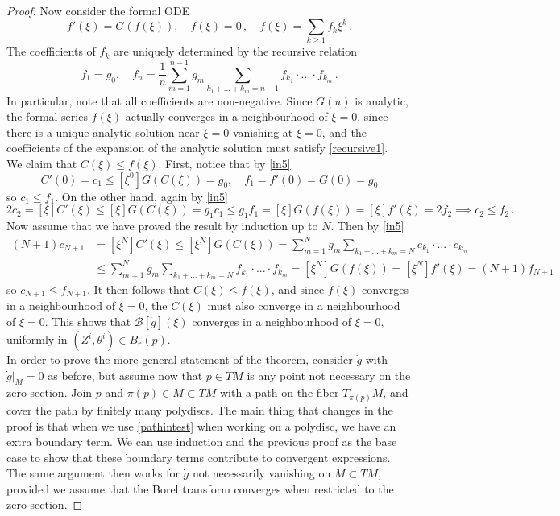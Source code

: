 \documentclass{article}
\theoremstyle{definition}
\numberwithin{equation}{section}
\begin{document}
\begin{proof}
Now consider the formal ODE
\begin{equation*}
    f'(\xi)=G(f(\xi)), \quad f(\xi)=0\,, \quad f(\xi)=\sum_{k\geq1}f_k\xi^k\,.
\end{equation*}
The coefficients of $f_k$ are uniquely determined by the recursive relation 
\begin{equation}\label{recursive1}
    f_1=g_0, \quad f_n=\frac{1}{n}\sum_{m=1}^{n-1}g_m\sum_{k_1+...+k_m=n-1}f_{k_1}\cdot...\cdot f_{k_m}\,.
\end{equation}
In particular, note that all coefficients are non-negative. Since $G(u)$ is analytic, the formal series $f(\xi)$ actually converges in a neighbourhood of $\xi=0$, since there is a unique analytic solution near $\xi=0$ vanishing at $\xi=0$, and the coefficients of the expansion of the analytic solution must satisfy \eqref{recursive1}.\\ 

We claim that $C(\xi)\leq f(\xi).$ First, notice that by \eqref{in5}
\begin{equation*}
    C'(0)=c_1\leq [\xi^0]G(C(\xi))=g_0, \quad f_1=f'(0)=G(0)=g_0
\end{equation*}
so $c_1\leq f_1.$ On the other hand, again by \eqref{in5}
\begin{equation*}
    2c_2=[\xi]C'(\xi)\leq [\xi]G(C(\xi))=g_1c_1\leq g_1f_1=[\xi]G(f(\xi))=[\xi]f'(\xi)=2f_2 \implies c_2\leq f_2\,.
\end{equation*}
Now assume that we have proved the result by induction up to $N$. Then by \eqref{in5}
\begin{equation*}
\begin{split}
    (N+1)c_{N+1}&=[\xi^{N}]C'(\xi)\leq [\xi^N]G(C(\xi))=\sum_{m=1}^{N}g_m\sum_{k_1+...+k_m=N}c_{k_1}\cdot...\cdot c_{k_m}\\
    &\leq \sum_{m=1}^{N}g_m\sum_{k_1+...+k_m=N}f_{k_1}\cdot...\cdot f_{k_m}=[\xi^N]G(f(\xi))=[\xi^N]f'(\xi)=(N+1)f_{N+1}
\end{split}
\end{equation*}
so $c_{N+1}\leq f_{N+1}. $ It then follows that $C(\xi)\leq f(\xi)$, and since $f(\xi)$ converges in a neighbourhood of $\xi=0$, the $C(\xi)$ must also converge in a neighbourhood of $\xi=0$. This shows that $\mathcal{B}[\dot{g}](\xi)$ converges in a neighbourhood of $\xi=0$, uniformly in $(Z^i,\theta^i)\in B_r(p)$.\\

In order to prove the more general statement of the theorem, consider $\dot{g}$ with $\dot{g}|_M=0$ as before, but assume now that $p\in TM$ is any point not necessary on the zero section. Join $p$ and $\pi(p)\in M\subset TM$ with a path on the fiber $T_{\pi(p)}M$, and cover the path by finitely many polydiscs. The main thing that changes in the proof is that when we use \eqref{pathintest} when working on a polydisc, we have an extra boundary term. We can use induction and the previous proof as the base case to show that these boundary terms contribute to convergent expressions. The same argument then works for $\dot{g}$ not necessarily vanishing on $M\subset TM$, provided we assume that the Borel transform converges when restricted to the zero section. 
\end{proof}
\end{document}
